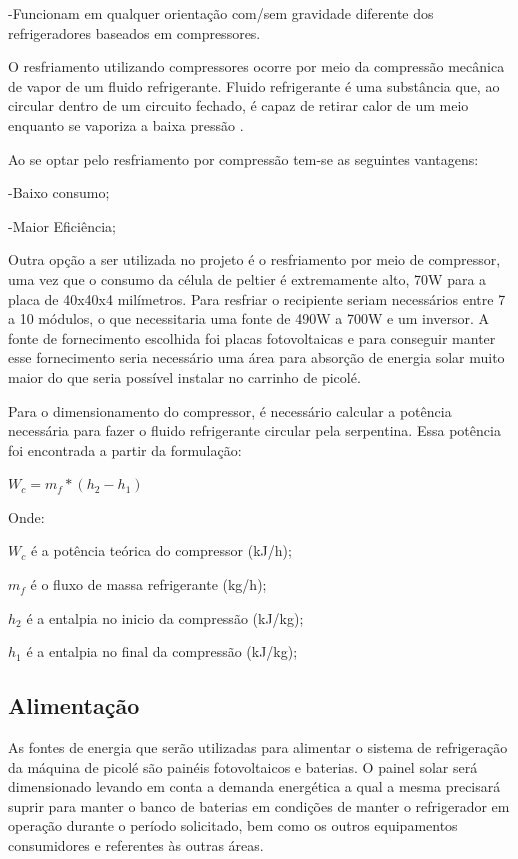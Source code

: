 -Funcionam em qualquer orientação com/sem gravidade diferente dos refrigeradores baseados em compressores.


O resfriamento utilizando compressores ocorre por meio da compressão mecânica de vapor de um fluido refrigerante. Fluido refrigerante é uma substância que, ao circular dentro de um circuito fechado, é capaz de retirar calor de um meio enquanto se vaporiza a baixa pressão \cite{teixeiraconcepccao}.

Ao se optar pelo resfriamento por compressão tem-se as seguintes vantagens:

-Baixo consumo;

-Maior Eficiência;

Outra opção a ser utilizada no projeto é o resfriamento por meio de compressor, uma vez que o consumo da célula de peltier é extremamente alto, 70W para a placa de 40x40x4 milímetros. Para resfriar o recipiente seriam necessários entre 7 a 10 módulos, o que necessitaria uma fonte de 490W a 700W e um inversor. A fonte de fornecimento escolhida foi placas fotovoltaicas e para conseguir manter esse fornecimento seria necessário uma área para absorção de energia solar muito maior do que seria possível instalar no carrinho de picolé. 


Para o dimensionamento do compressor, é necessário calcular a potência necessária para fazer o fluido refrigerante circular pela serpentina. Essa potência foi encontrada a
partir da formulação:

\begin{math} W_{c} = m_{f} * (h_{2} - h_{1})  \end{math}

Onde:

$W_{c}$ é a potência teórica do compressor (kJ/h);

$m_{f}$ é o fluxo de massa refrigerante (kg/h);

$h_{2}$ é a entalpia no inicio da compressão (kJ/kg);

$h_{1}$ é a entalpia no final da compressão (kJ/kg);


\subsection{Alimentação}
	As fontes de energia que serão utilizadas para alimentar o sistema de refrigeração da máquina de picolé são painéis fotovoltaicos e baterias. O painel solar será dimensionado levando em conta a demanda energética a qual a mesma precisará suprir para manter o banco de baterias em condições de manter o refrigerador em operação durante o período solicitado, bem como os outros equipamentos consumidores e referentes às outras áreas.
    
